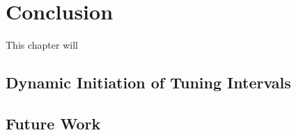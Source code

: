 \chapter[Conclusion]{Conclusion}
\label{cp:conclusion}

{
\parindent0pt
This chapter will \textellipsis
}

\section{Dynamic Initiation of Tuning Intervals}

\section{Future Work}

